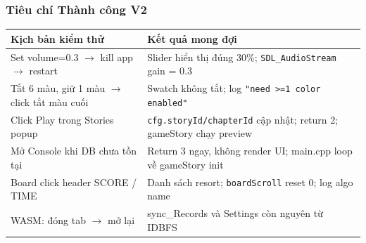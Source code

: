 \documentclass[12pt,a4paper]{article}
\begin{document}
\subsubsection{Tiêu chí Thành công V2}
\begin{tabularx}{\linewidth}{|l|X|}
    \hline
    \textbf{Kịch bản kiểm thử} & \textbf{Kết quả mong đợi} \\
    \hline
    Set volume=0.3 $\rightarrow$ kill app $\rightarrow$ restart & Slider hiển thị đúng 30\%; \texttt{SDL\_AudioStream} gain = 0.3 \\
    \hline
    Tắt 6 màu, giữ 1 màu $\rightarrow$ click tắt màu cuối & Swatch không tắt; log \texttt{"need >=1 color enabled"} \\
    \hline
    Click Play trong Stories popup & \texttt{cfg.storyId/chapterId} cập nhật; return 2; gameStory chạy preview \\
    \hline
    Mở Console khi DB chưa tồn tại & Return 3 ngay, không render UI; main.cpp loop về gameStory init \\
    \hline
    Board click header SCORE / TIME & Danh sách resort; \texttt{boardScroll} reset 0; log algo name \\
    \hline
    WASM: đóng tab $\rightarrow$ mở lại & sync\_Records và Settings còn nguyên từ IDBFS \\
    \hline
\end{tabularx}


\end{document}
